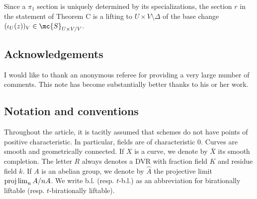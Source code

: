 Since a $\pi_{1}$ section is uniquely determined by its specializations, the section $r$ in the statement of Theorem C is a lifting to $U\times V \setminus \Delta$ of the base change $(\iota_{U}(z))_{V}\in\mc{S}_{U\times V/V}$.



\subsection*{Acknowledgements}

I would like to thank an anonymous referee for providing a very large number of comments. This note has become substantially better thanks to his or her work.

\subsection*{Notation and conventions}

Throughout the article, it is tacitly assumed that schemes do not have points of positive characteristic. In particular, fields are of characteristic $0$. Curves are smooth and geometrically connected. If $X$ is a curve, we denote by $\bar{X}$ its smooth completion. The letter $R$ always denotes a DVR with fraction field $K$ and residue field $k$. If $A$ is an abelian group, we denote by $\hat{A}$ the projective limit $\projlim_{n}A/nA$. We write b.l. (resp. $t$-b.l.) as an abbreviation for birationally liftable (resp. $t$-birationally liftable).






